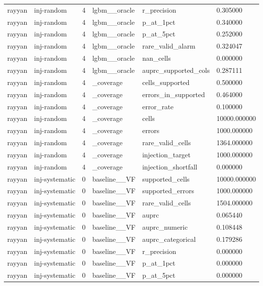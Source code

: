\begin{tabular}{llllll}
rayyan & inj-random & 4 & lgbm\_\_oracle & r\_precision & 0.305000 \\
rayyan & inj-random & 4 & lgbm\_\_oracle & p\_at\_1pct & 0.340000 \\
rayyan & inj-random & 4 & lgbm\_\_oracle & p\_at\_5pct & 0.252000 \\
rayyan & inj-random & 4 & lgbm\_\_oracle & rare\_valid\_alarm & 0.324047 \\
rayyan & inj-random & 4 & lgbm\_\_oracle & nan\_cells & 0.000000 \\
rayyan & inj-random & 4 & lgbm\_\_oracle & auprc\_supported\_cols & 0.287111 \\
rayyan & inj-random & 4 & \_coverage & cells\_supported & 0.500000 \\
rayyan & inj-random & 4 & \_coverage & errors\_in\_supported & 0.464000 \\
rayyan & inj-random & 4 & \_coverage & error\_rate & 0.100000 \\
rayyan & inj-random & 4 & \_coverage & cells & 10000.000000 \\
rayyan & inj-random & 4 & \_coverage & errors & 1000.000000 \\
rayyan & inj-random & 4 & \_coverage & rare\_valid\_cells & 1364.000000 \\
rayyan & inj-random & 4 & \_coverage & injection\_target & 1000.000000 \\
rayyan & inj-random & 4 & \_coverage & injection\_shortfall & 0.000000 \\
rayyan & inj-systematic & 0 & baseline\_\_VF & supported\_cells & 10000.000000 \\
rayyan & inj-systematic & 0 & baseline\_\_VF & supported\_errors & 1000.000000 \\
rayyan & inj-systematic & 0 & baseline\_\_VF & rare\_valid\_cells & 1504.000000 \\
rayyan & inj-systematic & 0 & baseline\_\_VF & auprc & 0.065440 \\
rayyan & inj-systematic & 0 & baseline\_\_VF & auprc\_numeric & 0.108448 \\
rayyan & inj-systematic & 0 & baseline\_\_VF & auprc\_categorical & 0.179286 \\
rayyan & inj-systematic & 0 & baseline\_\_VF & r\_precision & 0.000000 \\
rayyan & inj-systematic & 0 & baseline\_\_VF & p\_at\_1pct & 0.000000 \\
rayyan & inj-systematic & 0 & baseline\_\_VF & p\_at\_5pct & 0.000000 \\

\end{tabular}
